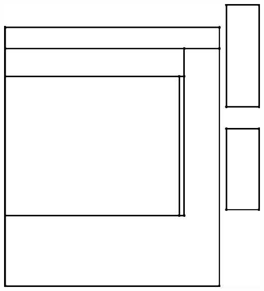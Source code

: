 \documentclass[portrait, a1paper, fontscale=0.5]{baposter}
\begin{document}
\begin{poster}
{\begin{center}
\begin{minipage}{4em}
	\end{minipage}
	\begin{minipage}{10em}
		\centering
		\includegraphics[scale=0.125]{optimization/variant_2.png}
	\end{minipage}
	\begin{minipage}{8em}
		\centering

\end{minipage}
\end{center}}
\end{poster}
\end{document}
